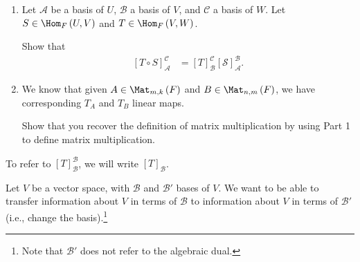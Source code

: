 \documentclass[10pt]{mypackage}
\begin{document}
\begin{exercise}\hfill
  \begin{enumerate}[(1)]
    \item Let $\mathcal{A}$ be a basis of $U$, $\mathcal{B}$ a basis of $V$, and $\mathcal{C}$ a basis of $W$. Let $S\in\Hom_{F}\left(U,V\right)$ and $T\in\Hom_{F}\left(V,W\right)$.\newline

  Show that
  \begin{align*}
    \left[T\circ S\right]_{\mathcal{A}}^{\mathcal{C}} &= \left[T\right]_{\mathcal{B}}^{\mathcal{C}}\left[\mathcal{S}\right]_{\mathcal{A}}^{\mathcal{B}}.
  \end{align*}
  \item We know that given $A\in \Mat_{m,k}\left(F\right)$ and $B\in \Mat_{n,m}\left(F\right)$, we have corresponding $T_A$ and $T_B$ linear maps.\newline

  Show that you recover the definition of matrix multiplication by using Part 1 to define matrix multiplication.
  \end{enumerate}
  \end{exercise}
  \begin{note}
    To refer to $\left[T\right]_{\mathcal{B}}^{\mathcal{B}}$, we will write $\left[T\right]_{\mathcal{B}}$.
  \end{note}
  Let $V$ be a vector space, with $\mathcal{B}$ and $\mathcal{B}'$ bases of $V$. We want to be able to transfer information about $V$ in terms of $\mathcal{B}$ to information about $V$ in terms of $\mathcal{B}'$ (i.e., change the basis).\footnote{Note that $\mathcal{B}'$ does not refer to the algebraic dual.}\newline
\end{document}
